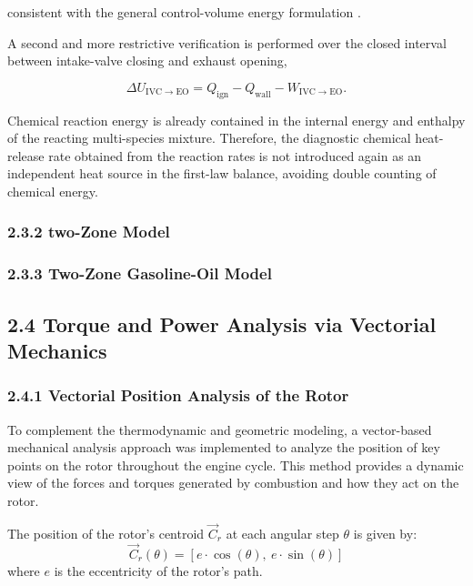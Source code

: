 \documentclass[man,floatsintext,noextraspace]{apa6}
\begin{document}
consistent with the general control-volume energy formulation
\cite{cengel2015thermodynamics}.

A second and more restrictive verification is performed over the closed interval between intake-valve closing and exhaust opening,

\begin{equation}
\Delta U_{\mathrm{IVC}\rightarrow\mathrm{EO}}
=
Q_{\mathrm{ign}}
-
Q_{\mathrm{wall}}
-
W_{\mathrm{IVC}\rightarrow\mathrm{EO}}.
\end{equation}

Chemical reaction energy is already contained in the internal energy and enthalpy of the reacting multi-species mixture. Therefore, the diagnostic chemical heat-release rate obtained from the reaction rates is not introduced again as an independent heat source in the first-law balance, avoiding double counting of chemical energy.
 
\subsubsection{2.3.2 two-Zone Model}
\subsubsection{2.3.3 Two-Zone Gasoline-Oil Model}

\subsection{2.4 Torque and Power Analysis via Vectorial Mechanics}

\subsubsection{2.4.1 Vectorial Position Analysis of the Rotor}

To complement the thermodynamic and geometric modeling, a vector-based mechanical analysis approach was implemented to analyze the position of key points on the rotor throughout the engine cycle. This method provides a dynamic view of the forces and torques generated by combustion and how they act on the rotor.



The position of the rotor's centroid \( \vec{C}_r \) at each angular step \( \theta \) is given by:
\begin{equation}
\vec{C}_r(\theta) = [e \cdot \cos(\theta),\ e \cdot \sin(\theta)]
\end{equation}
where \( e \) is the eccentricity of the rotor's path.
\end{document}
